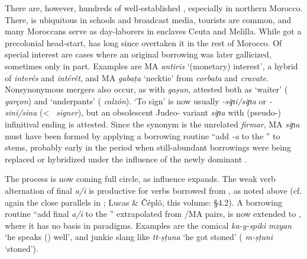\documentclass[output=paper]{langsci/langscibook}
\begin{document}
There are, however, hundreds of well-established  , especially in northern Morocco. There,  is ubiquitous in schools and broadcast media,  tourists are common, and many Moroccans serve as day-laborers in  enclaves Ceuta and Melilla. While  got a precolonial head-start,  has long since overtaken it in the rest of Morocco. Of special interest are cases where an original  borrowing was later gallicized, sometimes only in part. Examples are MA \textit{antiris} ‘(monetary) interest’, a hybrid of  \textit{interés} and  \textit{intérêt}, and MA \textit{g{\R}abaṭa} ‘necktie’ from  \textit{corbata} and  \textit{cravate}. Nonsynonymous mergers also occur, as with \textit{ga{\R}ṣun}, attested both as ‘waiter’ ( \textit{garçon}) and ‘underpants’ ( \textit{calzón}). ‘To sign’ is now usually \textit{\nobreakdash-siɲi/siɲa} or \textit{\nobreakdash-sini/sina} (<~ \textit{signer}), but an obsolescent Judeo- variant \textit{siɲa{\R}} with (pseudo-) infinitival ending is attested. Since the  synonym is the unrelated \textit{firmar}, MA \textit{siɲa{\R}} must have been formed by applying a borrowing routine “add \textit{-a{\R}} to the ” to  stems, probably early in the  period when still-abundant  borrowings were being replaced or hybridized under the influence of the newly dominant .

The process is now coming full circle, as  influence expands. The weak verb alternation of final \textit{a/i} is productive for verbs borrowed from , as noted above (cf. again the close parallels in ; Lucas \& Čéplö, this volume: §4.2).  A borrowing routine “add final \textit{a/i} to the ” extrapolated from /MA pairs, is now extended to , where it has no basis in   paradigms. Examples are the comical \textit{ka-y-spiki} \textit{mzyan} ‘he speaks () well’, and junkie slang like \textit{tt-ṣṭuna} ‘he got stoned’ ( \textit{m-ṣṭuni} ‘stoned’). 
\end{document}
